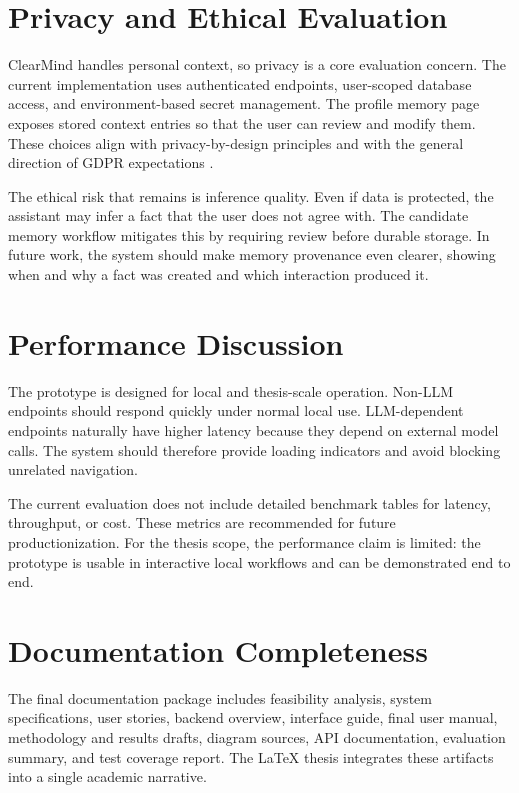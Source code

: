\section{Privacy and Ethical Evaluation}

ClearMind handles personal context, so privacy is a core evaluation concern. The current implementation uses authenticated endpoints, user-scoped database access, and environment-based secret management. The profile memory page exposes stored context entries so that the user can review and modify them. These choices align with privacy-by-design principles and with the general direction of GDPR expectations \cite{gdpr}.

The ethical risk that remains is inference quality. Even if data is protected, the assistant may infer a fact that the user does not agree with. The candidate memory workflow mitigates this by requiring review before durable storage. In future work, the system should make memory provenance even clearer, showing when and why a fact was created and which interaction produced it.

\section{Performance Discussion}

The prototype is designed for local and thesis-scale operation. Non-LLM endpoints should respond quickly under normal local use. LLM-dependent endpoints naturally have higher latency because they depend on external model calls. The system should therefore provide loading indicators and avoid blocking unrelated navigation.

The current evaluation does not include detailed benchmark tables for latency, throughput, or cost. These metrics are recommended for future productionization. For the thesis scope, the performance claim is limited: the prototype is usable in interactive local workflows and can be demonstrated end to end.

\section{Documentation Completeness}

The final documentation package includes feasibility analysis, system specifications, user stories, backend overview, interface guide, final user manual, methodology and results drafts, diagram sources, API documentation, evaluation summary, and test coverage report. The LaTeX thesis integrates these artifacts into a single academic narrative.


